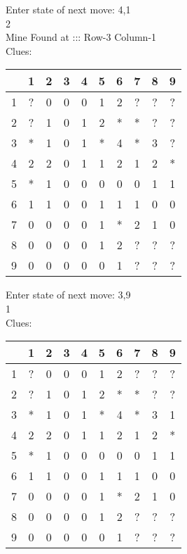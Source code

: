Enter state of next move: 4,1\\
2\\
Mine Found at ::: Row-3 Column-1\\
Clues:\\
\begin{tabular}{|c|c|c|c|c|c|c|c|c|c|}
\hline
  & 1 & 2 & 3 & 4 & 5 & 6 & 7 & 8 & 9\\
\hline
1 & ? & 0 & 0 & 0 & 1 & 2 & ? & ? & ?\\
\hline
2 & ? & 1 & 0 & 1 & 2 & * & * & ? & ?\\
\hline
3 & * & 1 & 0 & 1 & * & 4 & * & 3 & ?\\
\hline
4 & 2 & 2 & 0 & 1 & 1 & 2 & 1 & 2 & *\\
\hline
5 & * & 1 & 0 & 0 & 0 & 0 & 0 & 1 & 1\\
\hline
6 & 1 & 1 & 0 & 0 & 1 & 1 & 1 & 0 & 0\\
\hline
7 & 0 & 0 & 0 & 0 & 1 & * & 2 & 1 & 0\\
\hline
8 & 0 & 0 & 0 & 0 & 1 & 2 & ? & ? & ?\\
\hline
9 & 0 & 0 & 0 & 0 & 0 & 1 & ? & ? & ?\\
\hline
\end{tabular}

Enter state of next move: 3,9\\
1\\
Clues:\\
\begin{tabular}{|c|c|c|c|c|c|c|c|c|c|}
\hline
  & 1 & 2 & 3 & 4 & 5 & 6 & 7 & 8 & 9\\
\hline
1 & ? & 0 & 0 & 0 & 1 & 2 & ? & ? & ?\\
\hline
2 & ? & 1 & 0 & 1 & 2 & * & * & ? & ?\\
\hline
3 & * & 1 & 0 & 1 & * & 4 & * & 3 & 1\\
\hline
4 & 2 & 2 & 0 & 1 & 1 & 2 & 1 & 2 & *\\
\hline
5 & * & 1 & 0 & 0 & 0 & 0 & 0 & 1 & 1\\
\hline
6 & 1 & 1 & 0 & 0 & 1 & 1 & 1 & 0 & 0\\
\hline
7 & 0 & 0 & 0 & 0 & 1 & * & 2 & 1 & 0\\
\hline
8 & 0 & 0 & 0 & 0 & 1 & 2 & ? & ? & ?\\
\hline
9 & 0 & 0 & 0 & 0 & 0 & 1 & ? & ? & ?\\
\hline
\end{tabular}


